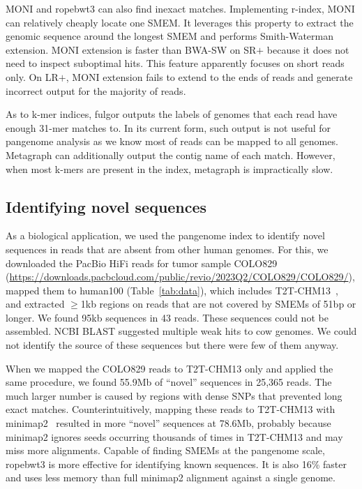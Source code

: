 \documentclass[webpdf,contemporary,large,namedate]{oup-authoring-template}%
\begin{document}
MONI and ropebwt3 can also find inexact matches.
Implementing r-index, MONI can relatively cheaply locate one SMEM.
It leverages this property to extract the genomic sequence around the longest SMEM and performs Smith-Waterman extension.
MONI extension is faster than BWA-SW on SR$+$ because it does not need to inspect suboptimal hits.
This feature apparently focuses on short reads only.
On LR$+$, MONI extension fails to extend to the ends of reads and generate incorrect output for the majority of reads.

As to k-mer indices, fulgor outputs the labels of genomes that each read have enough 31-mer matches to.
In its current form, such output is not useful for pangenome analysis as we know most of reads can be mapped to all genomes.
Metagraph can additionally output the contig name of each match.
However, when most k-mers are present in the index, metagraph is impractically slow.

\subsection{Identifying novel sequences}

As a biological application, we used the pangenome index to identify novel sequences in reads that are absent from other human genomes.
For this, we downloaded the PacBio HiFi reads for tumor sample COLO829 (\url{https://downloads.pacbcloud.com/public/revio/2023Q2/COLO829/COLO829/}),
mapped them to human100 (Table~\ref{tab:data}), which includes T2T-CHM13~\citep{Nurk:2022up},
and extracted $\ge$1kb regions on reads that are not covered by SMEMs of 51bp or longer.
We found 95kb sequences in 43 reads.
These sequences could not be assembled.
NCBI BLAST suggested multiple weak hits to cow genomes.
We could not identify the source of these sequences but there were few of them anyway.

When we mapped the COLO829 reads to T2T-CHM13 only and applied the same procedure,
we found 55.9Mb of ``novel'' sequences in 25,365 reads.
The much larger number is caused by regions with dense SNPs that prevented long exact matches.
Counterintuitively, mapping these reads to T2T-CHM13 with minimap2~\citep{Li:2018ab} resulted in more ``novel'' sequences at 78.6Mb,
probably because minimap2 ignores seeds occurring thousands of times in T2T-CHM13 and may miss more alignments.
Capable of finding SMEMs at the pangenome scale, ropebwt3 is more effective for identifying known sequences.
It is also 16\% faster and uses less memory than full minimap2 alignment against a single genome.
\end{document}
